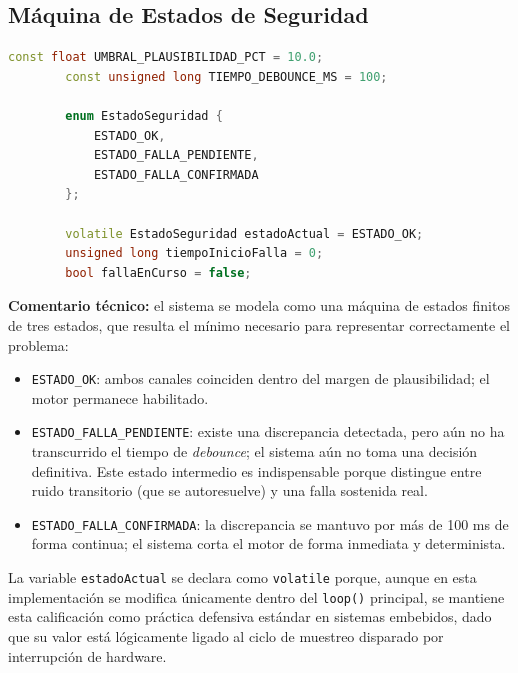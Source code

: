 \documentclass[12pt, letterpaper]{article}
\begin{document}
	\subsection{Máquina de Estados de Seguridad}
	\begin{lstlisting}[language=C++]
		const float UMBRAL_PLAUSIBILIDAD_PCT = 10.0;
		const unsigned long TIEMPO_DEBOUNCE_MS = 100;
		
		enum EstadoSeguridad {
			ESTADO_OK,
			ESTADO_FALLA_PENDIENTE,
			ESTADO_FALLA_CONFIRMADA
		};
		
		volatile EstadoSeguridad estadoActual = ESTADO_OK;
		unsigned long tiempoInicioFalla = 0;
		bool fallaEnCurso = false;
	\end{lstlisting}
	\textbf{Comentario técnico:} el sistema se modela como una máquina de estados finitos de tres estados, que resulta el mínimo necesario para representar correctamente el problema:
	\begin{itemize}
		\item \texttt{ESTADO\_OK}: ambos canales coinciden dentro del margen de plausibilidad; el motor permanece habilitado.
		\item \texttt{ESTADO\_FALLA\_PENDIENTE}: existe una discrepancia detectada, pero aún no ha transcurrido el tiempo de \textit{debounce}; el sistema aún no toma una decisión definitiva. Este estado intermedio es indispensable porque distingue entre ruido transitorio (que se autoresuelve) y una falla sostenida real.
		\item \texttt{ESTADO\_FALLA\_CONFIRMADA}: la discrepancia se mantuvo por más de 100 ms de forma continua; el sistema corta el motor de forma inmediata y determinista.
	\end{itemize}
	La variable \texttt{estadoActual} se declara como \texttt{volatile} porque, aunque en esta implementación se modifica únicamente dentro del \texttt{loop()} principal, se mantiene esta calificación como práctica defensiva estándar en sistemas embebidos, dado que su valor está lógicamente ligado al ciclo de muestreo disparado por interrupción de hardware.
	
\end{document}
